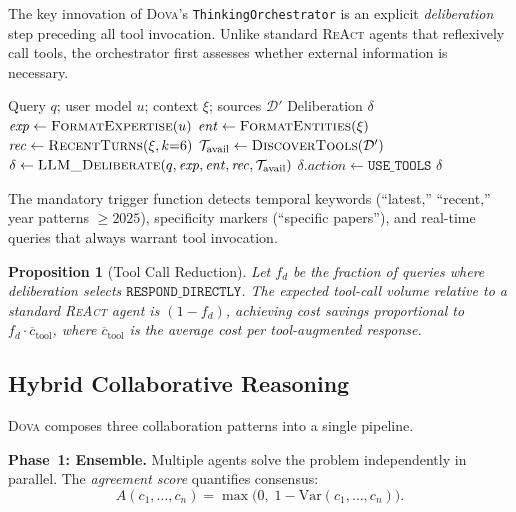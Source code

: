 \documentclass{article}
\theoremstyle{plain}
\newtheorem{proposition}[theorem]{Proposition}
\theoremstyle{definition}
\newcommand{\dova}{\textsc{Dova}}
\newcommand{\react}{\textsc{ReAct}}
\begin{document}
The key innovation of \dova{}'s \texttt{ThinkingOrchestrator} is an explicit
\emph{deliberation} step preceding all tool invocation.  Unlike standard
\react{} agents that reflexively call tools, the orchestrator first assesses
whether external information is necessary.

\begin{algorithm}[ht!]
\caption{Deliberation-First Orchestration}
\label{alg:deliberation}
\begin{algorithmic}
\REQUIRE Query $q$; user model $u$; context $\xi$; sources $\mathcal{D}'$
\ENSURE Deliberation $\delta$
\STATE $\mathit{exp} \leftarrow \textsc{FormatExpertise}(u)$
\STATE $\mathit{ent} \leftarrow \textsc{FormatEntities}(\xi)$
\STATE $\mathit{rec} \leftarrow \textsc{RecentTurns}(\xi, k{=}6)$
\STATE $\mathcal{T}_\mathrm{avail} \leftarrow \textsc{DiscoverTools}(\mathcal{D}')$
\STATE $\delta \leftarrow \textsc{LLM\_Deliberate}(q, \mathit{exp}, \mathit{ent}, \mathit{rec}, \mathcal{T}_\mathrm{avail})$
  \STATE $\delta.\mathit{action} \leftarrow \texttt{USE\_TOOLS}$
\ENDIF
\RETURN $\delta$
\end{algorithmic}
\end{algorithm}

The mandatory trigger function detects temporal keywords (``latest,''
``recent,'' year patterns ${\geq}2025$), specificity markers (``specific
papers''), and real-time queries that always warrant tool invocation.

\begin{proposition}[Tool Call Reduction]\label{prop:toolcall}
Let $f_d$ be the fraction of queries where deliberation selects
$\texttt{RESPOND\_DIRECTLY}$.  The expected tool-call volume relative to a
standard \react{} agent is $(1 - f_d)$, achieving cost savings proportional
to $f_d \cdot \overline{c}_{\mathrm{tool}}$, where
$\overline{c}_{\mathrm{tool}}$ is the average cost per tool-augmented response.
\end{proposition}

\subsection{Hybrid Collaborative Reasoning}\label{sec:hybrid}

\dova{} composes three collaboration patterns into a single pipeline.

\textbf{Phase~1: Ensemble.}\quad
Multiple agents solve the problem independently in parallel.  The
\emph{agreement score} quantifies consensus:
\begin{equation}\label{eq:agreement}
  A(c_1, \ldots, c_n) = \max\!\bigl(0,\; 1 - \mathrm{Var}(c_1, \ldots, c_n)\bigr).
\end{equation}
\end{document}

